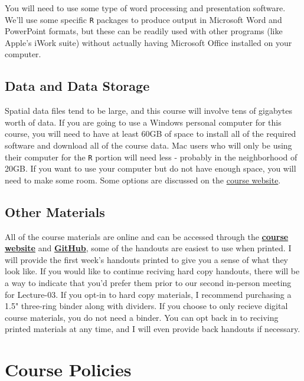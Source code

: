 \documentclass[
]{book}
\begin{document}
You will need to use some type of word processing and presentation software. We'll use some specific \texttt{R} packages to produce output in Microsoft Word and PowerPoint formats, but these can be readily used with other programs (like Apple's iWork suite) without actually having Microsoft Office installed on your computer.

\hypertarget{data-and-data-storage}{%
\section{Data and Data Storage}\label{data-and-data-storage}}

Spatial data files tend to be large, and this course will involve tens of gigabytes worth of data. If you are going to use a Windows personal computer for this course, you will need to have at least 60GB of space to install all of the required software and download all of the course data. Mac users who will only be using their computer for the \texttt{R} portion will need less - probably in the neighborhood of 20GB. If you want to use your computer but do not have enough space, you will need to make some room. Some options are discussed on the \href{https://slu-soc5650.github.io/docs/course-software/}{course website}.

\hypertarget{other-materials}{%
\section{Other Materials}\label{other-materials}}

All of the course materials are online and can be accessed through the \href{https://slu-soc5650.github.io}{\textbf{course website}} and \href{http://www.github.com}{\textbf{GitHub}}, some of the handouts are easiest to use when printed. I will provide the first week's handouts printed to give you a sense of what they look like. If you would like to continue reciving hard copy handouts, there will be a way to indicate that you'd prefer them prior to our second in-person meeting for Lecture-03. If you opt-in to hard copy materials, I recommend purchasing a 1.5" three-ring binder along with dividers. If you choose to only recieve digital course materials, you do not need a binder. You can opt back in to reciving printed materials at any time, and I will even provide back handouts if necessary.

\hypertarget{course-policies}{%
\chapter{Course Policies}\label{course-policies}}
\end{document}
